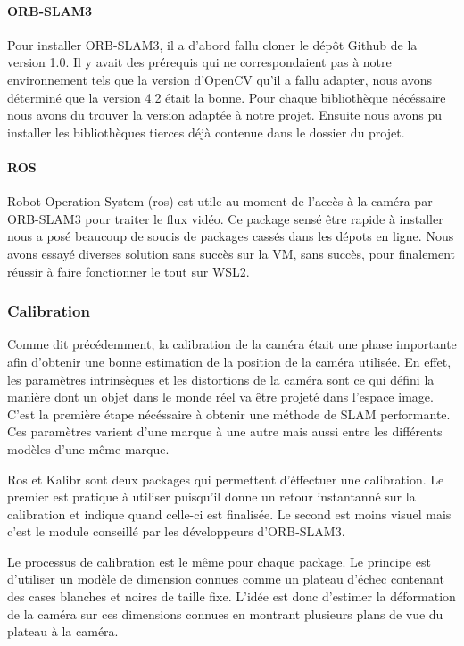 \documentclass[11pt]{article}
\begin{document}
        \paragraph{ORB-SLAM3}
          Pour installer ORB-SLAM3, il a d'abord fallu cloner le dépôt Github de la version 1.0. 
          Il y avait des prérequis qui ne correspondaient pas à notre environnement tels que la version d'OpenCV qu'il a fallu adapter,
          nous avons déterminé que la version 4.2 était la bonne. Pour chaque bibliothèque nécéssaire nous avons du trouver la version
          adaptée à notre projet. Ensuite nous avons pu installer les bibliothèques tierces déjà contenue dans le dossier du projet.        

        \paragraph{ROS}
          Robot Operation System (\acrshort{ros}) est utile au moment de l'accès à la caméra par ORB-SLAM3 pour traiter le flux vidéo.
          Ce package sensé être rapide à installer nous a posé beaucoup de soucis de packages cassés dans les dépots en ligne. Nous avons 
          essayé diverses solution sans succès sur la VM, sans succès, pour finalement réussir à faire fonctionner le tout sur WSL2. 

      \subsubsection{Calibration}
        Comme dit précédemment, la calibration de la caméra était une phase importante afin d'obtenir une bonne estimation de la position
        de la caméra utilisée. En effet, les paramètres intrinsèques et les distortions de la caméra sont ce qui défini la manière dont 
        un objet dans le monde réel va être projeté dans l'espace image. C'est la première étape nécéssaire à obtenir une méthode de 
        SLAM performante. Ces paramètres varient d'une marque à une autre mais aussi entre les différents modèles d'une même marque.

        Ros et Kalibr sont deux packages qui permettent d'éffectuer une calibration. Le premier est pratique à utiliser puisqu'il donne un 
        retour instantanné sur la calibration et indique quand celle-ci est finalisée. Le second est moins visuel mais c'est le module 
        conseillé par les développeurs d'ORB-SLAM3.

        Le processus de calibration est le même pour chaque package. Le principe est d'utiliser un modèle de dimension connues comme
        un plateau d'échec contenant des cases blanches et noires de taille fixe. L'idée est donc d'estimer la déformation de la caméra
        sur ces dimensions connues en montrant plusieurs plans de vue du plateau à la caméra.           
\end{document}
